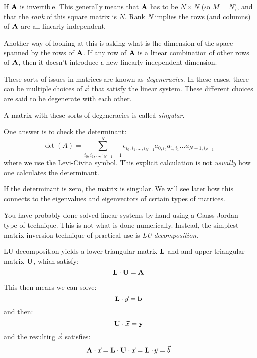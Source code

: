 \begin{answer}
If ${\bf A}$ is invertible. This generally means that ${\bf A}$ has to
be $N\times N$ (so $M=N$), and that the {\it rank} of this square
matrix is $N$. Rank $N$ implies the rows (and columns) of ${\bf A}$
are all linearly independent.

Another way of looking at this is asking what is the dimension of the
space spanned by the rows of ${\bf A}$. If any row of ${\bf A}$ is a
linear combination of other rows of ${\bf A}$, then it doesn't
introduce a new linearly independent dimension.

These sorts of issues in matrices are known as {\it degeneracies}. In
these cases, there can be multiple choices of $\vec{x}$ that satisfy
the linear system. These different choices are said to be degenerate
with each other.

A matrix with these sorts of degeneracies is called {\it singular}.
\end{answer}


\begin{answer}
  One answer is to check the determinant:
\begin{equation}
\label{eq:det}
\det(A) = \sum_{i_0, i_1, \ldots, i_{N-1} = 1}^{N} \epsilon_{i_0, i_1,
  \ldots, i_{N-1}} a_{0,i_0} a_{1,i_1} \ldots a_{{N-1}, i_{N-1}}
\end{equation}
where we use the Levi-Civita symbol. This explicit calculation is not
{\it usually} how one calculates the determinant.

If the determinant is zero, the matrix is singular. We will see later
how this connects to the eigenvalues and eigenvectors of certain types
of matrices.
\end{answer}

You have probably done solved linear systems by hand using a
Gauss-Jordan type of technique.  This is not what is done
numerically. Instead, the simplest matrix inversion technique of
practical use is {\it LU decomposition}.

LU decomposition yields a lower triangular matrix ${\bf L}$ and and
upper triangular matrix ${\bf U}$, which satisfy:
\begin{equation}
{\bf L} \cdot {\bf U} = {\bf A}
\end{equation}

This then means we can solve:
\begin{equation}
\label{eq:lyb}
{\bf L} \cdot \vec{y} = {\bf b}
\end{equation}
and then:
\begin{equation}
\label{eq:uxy}
{\bf U} \cdot \vec{x} = {\bf y}
\end{equation}
and the resulting $\vec{x}$ satisfies:
\begin{equation}
{\bf A} \cdot \vec{x} = {\bf L} \cdot {\bf U} \cdot \vec{x}  = {\bf L}
\cdot \vec{y} = \vec{b}
\end{equation}


